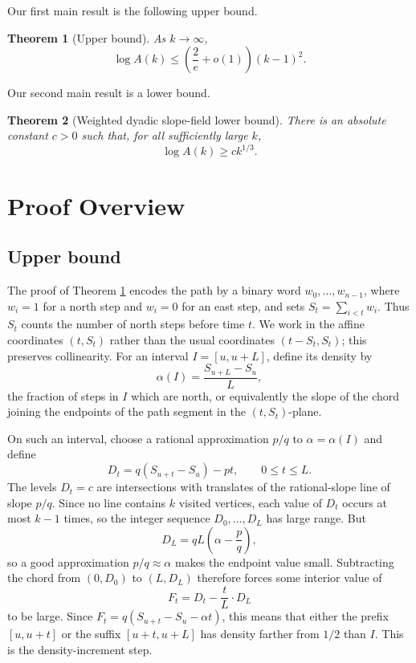 \documentclass[11pt]{article}
\newtheorem{theorem}{Theorem}[section]
\theoremstyle{definition}
\theoremstyle{remark}
\newcommand{\1}{\mathbf 1}
\begin{document}
\bigskip
\noindent
Our first main result is the following upper bound.

\begin{theorem}[Upper bound]\label{thm:upper_intro}
As $k\to\infty$,
\[
\log A(k)\le \left(\frac{2}{e}+o(1)\right)(k-1)^2.
\]
\end{theorem}

\smallskip
\noindent
Our second main result is a lower bound.

\begin{theorem}[Weighted dyadic slope-field lower bound]\label{thm:lower_intro}
There is an absolute constant $c>0$ such that, for all sufficiently large $k$,
\[
\log A(k)\ge c k^{1/3}.
\]
\end{theorem}

\section{Proof Overview}\label{sec:overview}

\subsection{Upper bound}

The proof of Theorem \ref{thm:upper_intro} encodes the path by a binary word $w_0,\ldots,w_{n-1}$, where $w_i=1$ for a north step and $w_i=0$ for an east step, and sets $S_t=\sum_{i<t}w_i$. Thus $S_t$ counts the number of north steps before time $t$. We work in the affine coordinates $(t,S_t)$ rather than the usual coordinates $(t-S_t,S_t)$; this preserves collinearity. For an interval $I=[u,u+L]$, define its density by
\[
\alpha(I)=\frac{S_{u+L}-S_u}{L},
\]
the fraction of steps in $I$ which are north, or equivalently the slope of the chord joining the endpoints of the path segment in the $(t,S_t)$-plane.

\bigskip
\noindent
On such an interval, choose a rational approximation $p/q$ to $\alpha=\alpha(I)$ and define
\[
D_t=q(S_{u+t}-S_u)-pt,\qquad 0\le t\le L.
\]
The levels $D_t=c$ are intersections with translates of the rational-slope line of slope $p/q$. Since no line contains $k$ visited vertices, each value of $D_t$ occurs at most $k-1$ times, so the integer sequence $D_0,\ldots,D_L$ has large range. But
\[
D_L=qL\left(\alpha-\frac pq\right),
\]
so a good approximation $p/q\approx\alpha$ makes the endpoint value small. Subtracting the chord from $(0,D_0)$ to $(L,D_L)$ therefore forces some interior value of
\[
F_t=D_t-\frac{t}{L}\cdot D_L
\]
to be large. Since $F_t=q(S_{u+t}-S_u-\alpha t)$, this means that either the prefix $[u,u+t]$ or the suffix $[u+t,u+L]$ has density farther from $1/2$ than $I$. This is the density-increment step.
\end{document}
